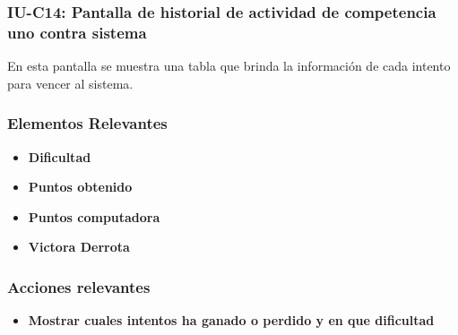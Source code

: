 
\subsubsection{IU-C14: Pantalla de historial de actividad de competencia uno contra sistema}

 En esta pantalla se muestra una tabla que brinda la información de cada intento para vencer al sistema.


\subsubsection{Elementos Relevantes}

    \begin{itemize}
    \item {\bf Dificultad}
    \item {\bf Puntos obtenido}
    \item {\bf Puntos computadora}
    \item {\bf Victora Derrota}
    \end{itemize}

\subsubsection{Acciones relevantes}

    \begin{itemize}
    \item {\bf Mostrar cuales intentos ha ganado o perdido y en que dificultad}

    \end{itemize}

\clearpage
